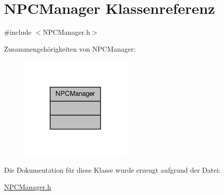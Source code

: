 \hypertarget{class_n_p_c_manager}{\section{N\-P\-C\-Manager Klassenreferenz}
\label{class_n_p_c_manager}
}


{\ttfamily \#include $<$N\-P\-C\-Manager.\-h$>$}



Zusammengehörigkeiten von N\-P\-C\-Manager\-:\nopagebreak
\begin{figure}[H]
\begin{center}
\leavevmode
\includegraphics[width=156pt]{class_n_p_c_manager__coll__graph}
\end{center}
\end{figure}


Die Dokumentation für diese Klasse wurde erzeugt aufgrund der Datei\-:\begin{DoxyCompactItemize}
\item 
\hyperlink{_n_p_c_manager_8h}{N\-P\-C\-Manager.\-h}\end{DoxyCompactItemize}
